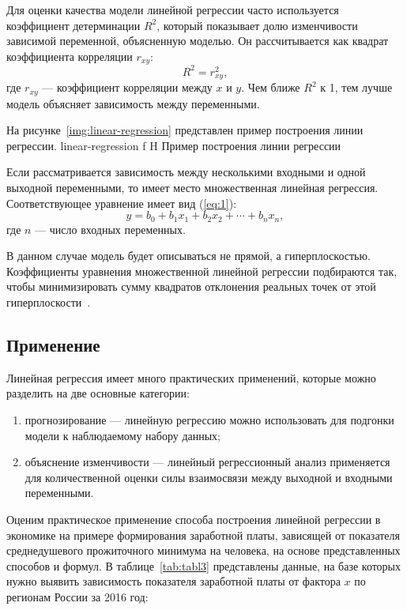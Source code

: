 Для оценки качества модели линейной регрессии часто используется коэффициент детерминации $R^2$, который показывает долю изменчивости зависимой переменной, объясненную моделью.
Он рассчитывается как квадрат коэффициента корреляции $r_{xy}$:
\begin{equation}
    R^2 = r_{xy}^2,
\end{equation}
где $r_{xy}$ --- коэффициент корреляции между $x$ и $y$.
Чем ближе $R^2$ к 1, тем лучше модель объясняет зависимость между переменными.

На рисунке~\ref{img:linear-regression} представлен пример построения линии регрессии.
{linear-regression}
{f}
{H}
{\textwidth}
{Пример построения линии регрессии}

Если рассматривается зависимость между несколькими входными и одной выходной переменными, то имеет место множественная линейная регрессия.
Соответствующее уравнение имеет вид (\ref{eq:1}):
\begin{equation}
    y = b_0 + b_1 x_1 + b_2 x_2 + \cdots+ b_n x_n,
    \label{eq:1}
\end{equation}
где $n$ --- число входных переменных.

В данном случае модель будет описываться не прямой, а гиперплоскостью.
Коэффициенты уравнения множественной линейной регрессии подбираются так, чтобы минимизировать сумму квадратов отклонения реальных точек от этой гиперплоскости~\cite{loginom}.

\subsection*{Применение}

Линейная регрессия имеет много практических применений, которые можно разделить на две основные категории:
\begin{enumerate}[label=\arabic*), leftmargin=1.6\parindent]
    \item прогнозирование --- линейную регрессию можно использовать для подгонки модели к наблюдаемому набору данных;
    \item объяснение изменчивости --- линейный регрессионный анализ применяется для количественной оценки силы взаимосвязи между выходной и входными переменными.
\end{enumerate}

Оценим практическое применение способа построения линейной регрессии в экономике на примере формирования заработной платы, зависящей от показателя среднедушевого прожиточного минимума на человека, на основе представленных способов и формул.
В таблице~\ref{tab:tabl3} представлены данные, на базе которых нужно выявить зависимость показателя заработной платы от фактора $x$ по регионам России за 2016 год:

